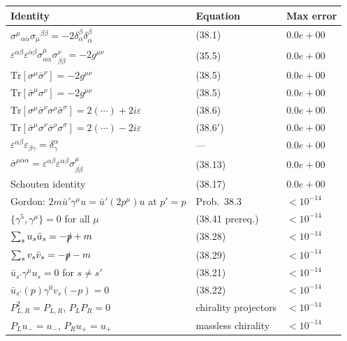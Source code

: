 \documentclass[12pt]{article}
\begin{document}
\begin{center}
\renewcommand{\arraystretch}{1.5}
\begin{tabular}{@{}lll@{}}
  \toprule
  Identity & Equation & Max error \\
  \midrule
  $\sigma^\mu{}_{\alpha\dot\alpha}\sigma_\mu{}^{\beta\dot\beta}=-2\delta_\alpha^\beta\delta_{\dot\alpha}^{\dot\beta}$
    & (38.1) & $0.0e+00$ \\
  $\varepsilon^{\alpha\beta}\varepsilon^{\dot\alpha\dot\beta}\sigma^\mu_{\alpha\dot\alpha}\sigma^\nu_{\beta\dot\beta}=-2g^{\mu\nu}$
    & (35.5) & $0.0e+00$ \\
  $\mathrm{Tr}[\sigma^\mu\bar\sigma^\nu]=-2g^{\mu\nu}$
    & (38.5) & $0.0e+00$ \\
  $\mathrm{Tr}[\bar\sigma^\mu\sigma^\nu]=-2g^{\mu\nu}$
    & (38.5) & $0.0e+00$ \\
  $\mathrm{Tr}[\sigma^\mu\bar\sigma^\nu\sigma^\rho\bar\sigma^\sigma]=2(\cdots)+2i\varepsilon$
    & (38.6) & $0.0e+00$ \\
  $\mathrm{Tr}[\bar\sigma^\mu\sigma^\nu\bar\sigma^\rho\sigma^\sigma]=2(\cdots)-2i\varepsilon$
    & (38.6$'$) & $0.0e+00$ \\
  $\varepsilon^{\alpha\beta}\varepsilon_{\beta\gamma}=\delta^\alpha_\gamma$
    & --- & $0.0e+00$ \\
  $\bar\sigma^{\mu\dot\alpha\alpha}=\varepsilon^{\alpha\beta}\varepsilon^{\dot\alpha\dot\beta}\sigma^\mu_{\beta\dot\beta}$
    & (38.13) & $0.0e+00$ \\
  Schouten identity & (38.17) & $0.0e+00$ \\
  Gordon: $2m\bar u'\gamma^\mu u = \bar u'(2p^\mu)u$ at $p'=p$ & Prob.~38.3 & $<10^{-14}$ \\
  $\{\gamma^5,\gamma^\mu\}=0$ for all $\mu$ & (38.41 prereq.) & $<10^{-14}$ \\
  $\sum_s u_s\bar u_s = -\slashed{p}+m$ & (38.28) & $<10^{-14}$ \\
  $\sum_s v_s\bar v_s = -\slashed{p}-m$ & (38.29) & $<10^{-14}$ \\
  $\bar u_{s'}\gamma^\mu u_s = 0$ for $s\neq s'$ & (38.21) & $<10^{-14}$ \\
  $\bar u_{s'}(p)\gamma^0 v_s(-p)=0$ & (38.22) & $<10^{-14}$ \\
  $P_{L,R}^2=P_{L,R}$, $P_LP_R=0$ & chirality projectors & $<10^{-14}$ \\
  $P_Lu_- = u_-$, $P_Ru_+ = u_+$ & massless chirality & $<10^{-14}$ \\
  \bottomrule
\end{tabular}
\end{center}
\end{document}
